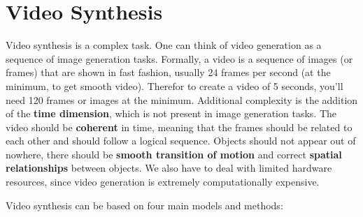 \section{Video Synthesis}
\label{sec:video_synthesis}

Video synthesis is a complex task. One can think of video generation as a sequence of image generation tasks. Formally, a video is a sequence of images (or frames) that are shown in fast fashion, usually 24 frames per second (at the minimum, to get smooth video). Therefor to create a video of 5 seconds, you'll need 120 frames or images at the minimum. Additional complexity is the addition of the \textbf{time dimension}, which is not present in image generation tasks. The video should be \textbf{coherent} in time, meaning that the frames should be related to each other and should follow a logical sequence. Objects should not appear out of nowhere, there should be \textbf{smooth transition of motion} and correct \textbf{spatial relationships} between objects. We also have to deal with limited hardware resources, since video generation is extremely computationally expensive.



Video synthesis can be based on four main models and methods:

